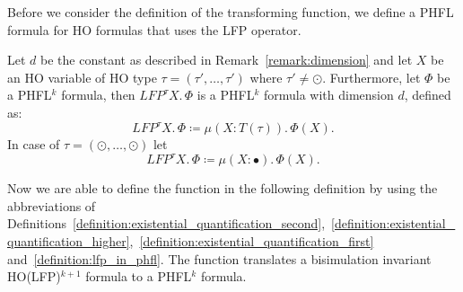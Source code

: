 Before we consider the definition of the transforming function, we define a PHFL formula for HO formulas that uses the
LFP operator.

\begin{definition}
\label{definition:lfp_in_phfl}
   Let $d$ be the constant as described in Remark~\ref{remark:dimension} and let $X$ be an HO variable of HO type $\tau = (\tau', \dots, \tau')$ where $\tau' \neq \odot$. Furthermore, let
    $\Phi$ be a PHFL$^k$ formula, then $LFP^\tau X.\,\Phi$ is a PHFL$^k$ formula with dimension $d$, defined as:
    \[LFP^\tau X.\,\Phi \coloneqq \mu (X \colon T(\tau)).\,\Phi(X).\]
    In case of $\tau = (\odot, \dots, \odot)$ let
    \[LFP^{\tau} X.\,\Phi \coloneqq \mu (X \colon \bullet).\,\Phi(X).\]
\end{definition}

Now we are able to define the function in the following definition by using the abbreviations of Definitions~\ref{definition:existential_quantification_second},~\ref{definition:existential_quantification_higher},~\ref{definition:existential_quantification_first} and~\ref{definition:lfp_in_phfl}. The function translates a bisimulation invariant HO(LFP)$^{k+1}$ formula to a PHFL$^k$ formula.

